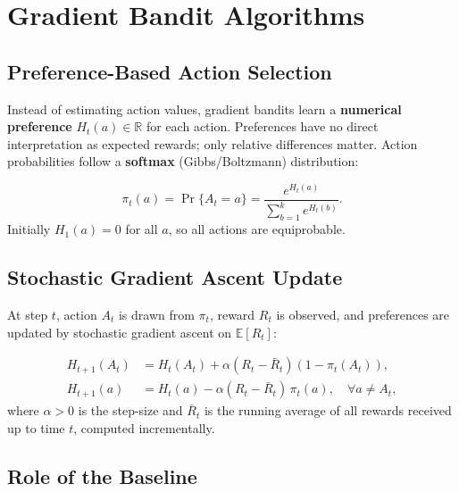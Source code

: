 \documentclass[11pt,a4paper]{article}
\theoremstyle{definition}
\theoremstyle{plain}
\theoremstyle{remark}
\begin{document}
\section{Gradient Bandit Algorithms}

\subsection{Preference-Based Action Selection}

Instead of estimating action values, gradient bandits learn a \textbf{numerical preference} $H_t(a) \in \mathbb{R}$ for each action. Preferences have no direct interpretation as expected rewards; only relative differences matter. Action probabilities follow a \textbf{softmax} (Gibbs/Boltzmann) distribution:

\begin{tcolorbox}[colback=blue!5!white,colframe=blue!60!black,title=\textbf{Softmax Action Probabilities}]
\[
    \pi_t(a) = \Pr\{A_t = a\} = \frac{e^{H_t(a)}}{\displaystyle\sum_{b=1}^{k} e^{H_t(b)}}.
\]
Initially $H_1(a) = 0$ for all $a$, so all actions are equiprobable.
\end{tcolorbox}

\subsection{Stochastic Gradient Ascent Update}

At step $t$, action $A_t$ is drawn from $\pi_t$, reward $R_t$ is observed, and preferences are updated by stochastic gradient ascent on $\mathbb{E}[R_t]$:

\begin{tcolorbox}[colback=blue!5!white,colframe=blue!60!black,title=\textbf{Gradient Bandit Update}]
\begin{align*}
    H_{t+1}(A_t) &= H_t(A_t) + \alpha(R_t - \bar{R}_t)(1 - \pi_t(A_t)), \\
    H_{t+1}(a)   &= H_t(a)   - \alpha(R_t - \bar{R}_t)\,\pi_t(a), \quad \forall a \neq A_t,
\end{align*}
where $\alpha > 0$ is the step-size and $\bar{R}_t$ is the running average of all rewards received up to time $t$, computed incrementally.
\end{tcolorbox}

\subsection{Role of the Baseline}
\end{document}
